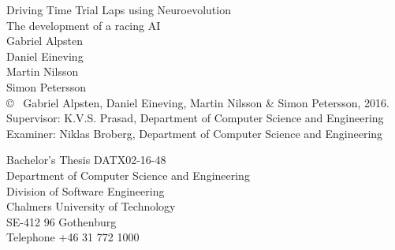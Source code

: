 \newpage
\thispagestyle{plain}
\vspace*{4.5cm}
\noindent
Driving Time Trial Laps using Neuroevolution\\
The development of a racing AI\\
{\large Gabriel Alpsten}\\
{\large Daniel Eineving}\\
{\large Martin Nilsson}\\
{\large Simon Petersson}\\

\noindent
\copyright ~ Gabriel Alpsten, Daniel Eineving, Martin Nilsson \& Simon Petersson, 2016.\\ \setlength{\parskip}{1cm}
\noindent
Supervisor: K.V.S. Prasad, Department of Computer Science and Engineering\\
Examiner: Niklas Broberg, Department of Computer Science and Engineering \\ \setlength{\parskip}{1cm}

\noindent
Bachelor's Thesis DATX02-16-48 \\
Department of Computer Science and Engineering\\
Division of Software Engineering\\
Chalmers University of Technology\\
SE-412 96 Gothenburg\\
Telephone +46 31 772 1000 \setlength{\parskip}{0.5cm}

\vfill



